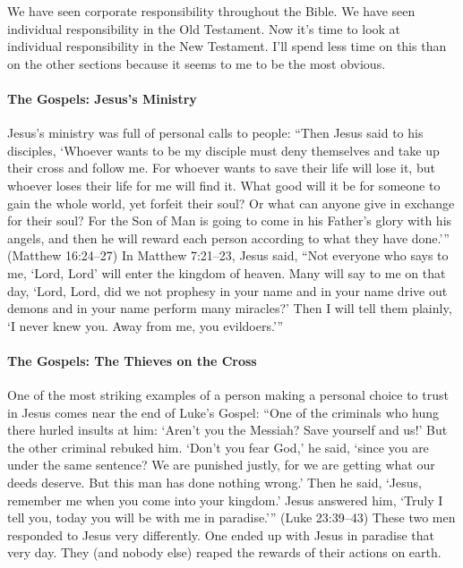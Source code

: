 We have seen corporate responsibility throughout the Bible. We have seen
individual responsibility in the Old Testament. Now it's time to look at
individual responsibility in the New Testament. I'll spend less time on
this than on the other sections because it seems to me to be the most obvious.

\paragraph{The Gospels: Jesus's Ministry} Jesus's ministry was full of personal
calls to people: \enquote{Then Jesus said to his disciples, \enquote{Whoever
wants to be my disciple must deny themselves and take up their cross and follow
me. For whoever wants to save their life will lose it, but whoever loses their
life for me will find it. What good will it be for someone to gain the whole
world, yet forfeit their soul? Or what can anyone give in exchange for their
soul? For the Son of Man is going to come in his Father's glory with his angels,
and then he will reward each person according to what they have done.}} (Matthew
16:24--27) In Matthew 7:21--23, Jesus said, \enquote{Not everyone who says to
me, \enquote{Lord, Lord} will enter the kingdom of heaven. Many will say to me
on that day, \enquote{Lord, Lord, did we not prophesy in your name and in your
name drive out demons and in your name perform many miracles?} Then I will tell
them plainly, \enquote{I never knew you. Away from me, you evildoers.}}

\paragraph{The Gospels: The Thieves on the Cross} One of the most striking
examples of a person making a personal choice to trust in Jesus comes near the
end of Luke's Gospel: \enquote{One of the criminals who hung there hurled
insults at him: \enquote{Aren't you the Messiah? Save yourself and us!} But the
other criminal rebuked him. \enquote{Don't you fear God,} he said,
\enquote{since you are under the same sentence? We are punished justly, for we
are getting what our deeds deserve. But this man has done nothing wrong.} Then
he said, \enquote{Jesus, remember me when you come into your kingdom.} Jesus
answered him, \enquote{Truly I tell you, today you will be with me in
paradise.}} (Luke 23:39--43) These two men responded to Jesus very differently.
One ended up with Jesus in paradise that very day. They (and nobody else) reaped
the rewards of their actions on earth.

